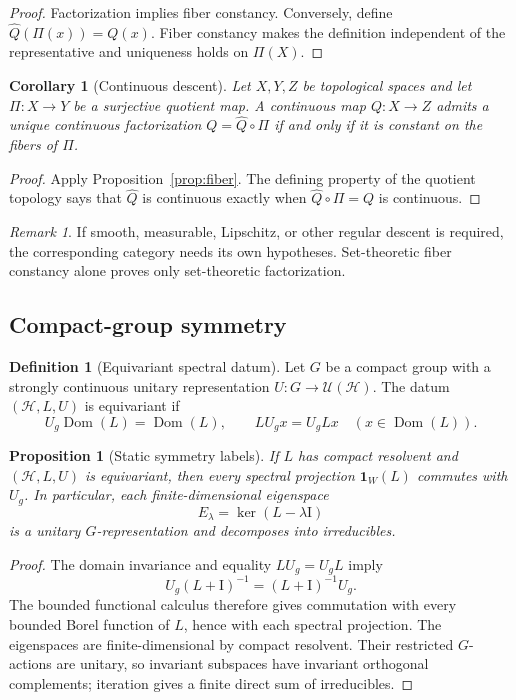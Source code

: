 \documentclass[11pt,a4paper]{article}
\newtheorem{proposition}[theorem]{Proposition}
\newtheorem{corollary}[theorem]{Corollary}
\theoremstyle{definition}
\newtheorem{definition}[theorem]{Definition}
\theoremstyle{remark}
\newtheorem{remark}[theorem]{Remark}
\newcommand{\Hcal}{\mathcal H}
\newcommand{\Dom}{\operatorname{Dom}}
\newcommand{\Id}{\mathrm I}
\begin{document}
\begin{proof}
Factorization implies fiber constancy. Conversely, define
\(\widehat Q(\Pi(x))=Q(x)\). Fiber constancy makes the definition independent
of the representative and uniqueness holds on \(\Pi(X)\).
\end{proof}

\begin{corollary}[Continuous descent]
Let \(X,Y,Z\) be topological spaces and let \(\Pi:X\to Y\) be a surjective
quotient map. A continuous map \(Q:X\to Z\) admits a unique continuous
factorization \(Q=\widehat Q\circ\Pi\) if and only if it is constant on the
fibers of \(\Pi\).
\end{corollary}

\begin{proof}
Apply Proposition~\ref{prop:fiber}. The defining property of the quotient topology says
that \(\widehat Q\) is continuous exactly when
\(\widehat Q\circ\Pi=Q\) is continuous.
\end{proof}

\begin{remark}
If smooth, measurable, Lipschitz, or other regular descent is required, the
corresponding category needs its own hypotheses. Set-theoretic fiber constancy
alone proves only set-theoretic factorization.
\end{remark}

\subsection{Compact-group symmetry}

\begin{definition}[Equivariant spectral datum]
Let \(G\) be a compact group with a strongly continuous unitary representation
\(U:G\to\mathcal U(\Hcal)\). The datum \((\Hcal,L,U)\) is equivariant if
\[
 U_g\Dom(L)=\Dom(L),
 \qquad
 LU_gx=U_gLx
 \quad(x\in\Dom(L)).
\]
\end{definition}

\begin{proposition}[Static symmetry labels]
\label{prop:static-symmetry}
If \(L\) has compact resolvent and \((\Hcal,L,U)\) is equivariant, then every
spectral projection \(\mathbf1_W(L)\) commutes with \(U_g\). In particular,
each finite-dimensional eigenspace
\[
 E_\lambda=\ker(L-\lambda\Id)
\]
is a unitary \(G\)-representation and decomposes into irreducibles.
\end{proposition}

\begin{proof}
The domain invariance and equality \(LU_g=U_gL\) imply
\[
 U_g(L+\Id)^{-1}=(L+\Id)^{-1}U_g.
\]
The bounded functional calculus therefore gives commutation with every bounded
Borel function of \(L\), hence with each spectral projection. The eigenspaces
are finite-dimensional by compact resolvent. Their restricted \(G\)-actions
are unitary, so invariant subspaces have invariant orthogonal complements;
iteration gives a finite direct sum of irreducibles.
\end{proof}
\end{document}
